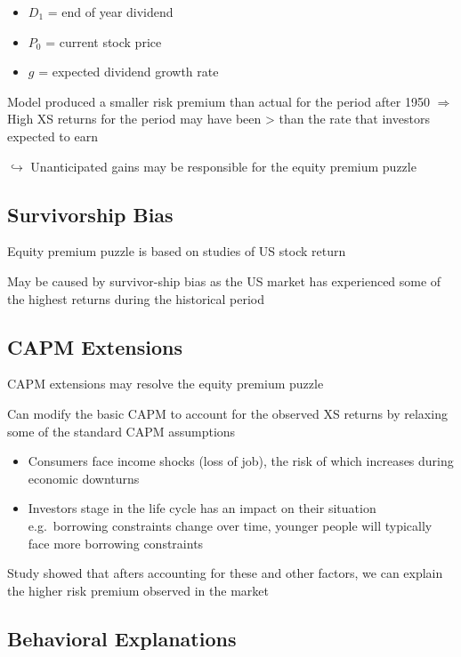 \documentclass[]{book}
\theoremstyle{definition}
\theoremstyle{definition}
\theoremstyle{remark}
\begin{document}
\begin{itemize}
\item
  \(D_1\) = end of year dividend
\item
  \(P_0\) = current stock price
\item
  \(g\) = expected dividend growth rate
\end{itemize}

Model produced a smaller risk premium than actual for the period after
1950 \(\Rightarrow\) High XS returns for the period may have been
\textgreater{} than the rate that investors expected to earn

\(\hookrightarrow\) Unanticipated gains may be responsible for the
equity premium puzzle

\subsection{Survivorship Bias}\label{survivorship-bias}

Equity premium puzzle is based on studies of US stock return

May be caused by survivor-ship bias as the US market has experienced
some of the highest returns during the historical period

\subsection{CAPM Extensions}\label{capm-extensions-1}

CAPM extensions may resolve the equity premium puzzle

Can modify the basic CAPM to account for the observed XS returns by
relaxing some of the standard CAPM assumptions

\begin{itemize}
\item
  Consumers face income shocks (loss of job), the risk of which
  increases during economic downturns
\item
  Investors stage in the life cycle has an impact on their situation
  e.g.~borrowing constraints change over time, younger people will
  typically face more borrowing constraints
\end{itemize}

Study showed that afters accounting for these and other factors, we can
explain the higher risk premium observed in the market

\subsection{Behavioral Explanations}\label{behavioral-explanations-1}
\end{document}
